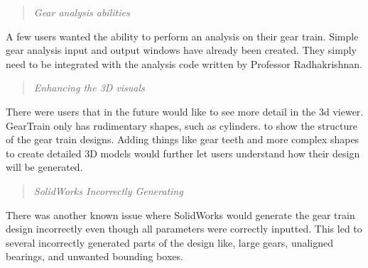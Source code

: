 \begin{doublespace}
\begin{quote}
    \emph{Gear analysis abilities}
\end{quote}
\noindent A few users wanted the ability to perform an analysis on their gear train. Simple gear analysis input and output windows have already been created. They simply need to be integrated with the analysis code written by Professor Radhakrishnan. 
\begin{quote}
    \emph{Enhancing the 3D visuals}
\end{quote}
There were users  that in the future would like to see more detail in the 3d viewer. GearTrain only has rudimentary shapes, such as cylinders. to show the structure of the gear train designs. Adding things like gear teeth and more complex shapes to create detailed 3D models would further let users understand how their design will be generated.
\begin{quote}
    \emph{SolidWorks Incorrectly Generating}
\end{quote}
\noindent There was another known issue where SolidWorks would generate the gear train design incorrectly even though all parameters were correctly inputted. This led to several incorrectly generated parts of the design like, large gears, unaligned bearings, and unwanted bounding boxes.

\end{doublespace}